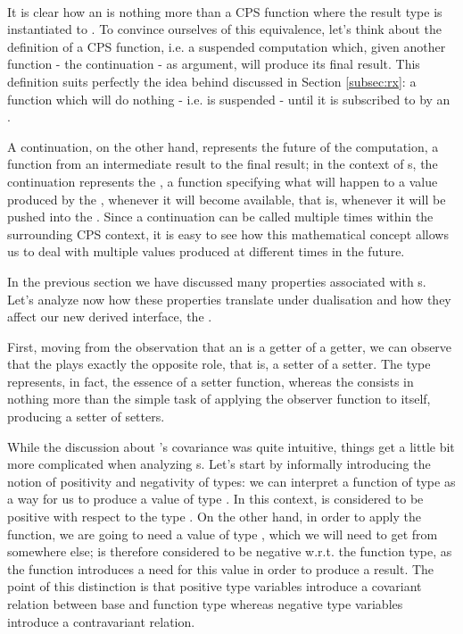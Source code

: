 \\

It is clear how an  is nothing more than a CPS function where the result type  is instantiated to . To convince ourselves of this equivalence, let's think about the definition of a CPS function, i.e. a suspended computation which, given another function - the continuation - as argument, will produce its final result. This definition suits perfectly the idea behind  discussed in Section \ref{subsec:rx}: a function which will do nothing - i.e. is suspended - until it is subscribed to by an .

A continuation, on the other hand, represents the future of the computation, a function from an intermediate result to the final result\cite{newbern-monads}; in the context of s, the continuation represents the , a function specifying what will happen to a value produced by the , whenever it will become available, that is, whenever it will be pushed into the . Since a continuation can be called multiple times within the surrounding CPS context, it is easy to see how this mathematical concept allows us to deal with multiple values produced at different times in the future.

In the previous section we have discussed many properties associated with s. Let's analyze now how these properties translate under dualisation and how they affect our new derived interface, the .

First, moving from the observation that an  is a getter of a getter, we can observe that the  plays exactly the opposite role, that is, a setter of a setter. The type  represents, in fact, the essence of a setter function, whereas the  consists in nothing more than the simple task of applying the observer function to itself, producing a setter of setters. 

While the discussion about 's covariance was quite intuitive, things get a little bit more complicated when analyzing s. Let's start by informally introducing the notion of positivity and negativity of types: we can interpret a function of type  as a way for us to produce a value of type . In this context,  is considered to be positive with respect to the type . On the other hand, in order to apply the function, we are going to need a value of type , which we will need to get from somewhere else;  is therefore considered to be negative w.r.t. the function type, as the function introduces a need for this value in order to produce a result. The point of this distinction is that positive type variables introduce a covariant relation between base and function type whereas negative type variables introduce a contravariant relation.

